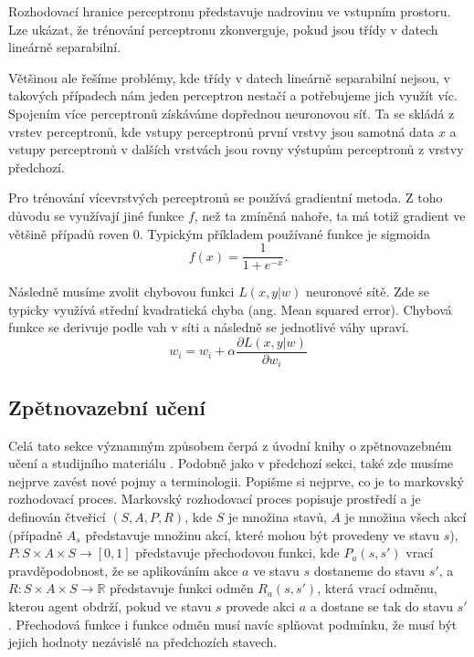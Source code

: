 Rozhodovací hranice perceptronu představuje nadrovinu ve vstupním prostoru. Lze ukázat, že trénování perceptronu zkonverguje, pokud jsou třídy v datech lineárně separabilní.

Většinou ale řešíme problémy, kde třídy v datech lineárně separabilní nejsou, v takových případech nám jeden perceptron nestačí a potřebujeme jich využít víc.
Spojením více perceptronů získáváme dopřednou neuronovou síť.
Ta se skládá z vrstev perceptronů, kde vstupy perceptronů první vrstvy jsou samotná data $x$ a vstupy perceptronů v dalších vrstvách jsou rovny výstupům perceptronů z vrstvy předchozí.

Pro trénování vícevrstvých perceptronů se používá gradientní metoda. Z toho důvodu se využívají jiné funkce $f$, než ta zmíněná nahoře, ta má totiž gradient ve většině případů roven 0.
Typickým příkladem používané funkce je sigmoida \[f(x) = \frac{1}{1+e^{-x}}.\]

Následně musíme zvolit chybovou funkci $L(x,y|w)$ neuronové sítě. Zde se typicky využívá střední kvadratická chyba (ang. Mean squared error).
Chybová funkce se derivuje podle vah v síti a následně se jednotlivé váhy upraví.
\newline
\[w_i = w_i + \alpha\frac{\partial L(x,y|w)}{\partial w_i}\]




\subsection{Zpětnovazební učení}
Celá tato sekce významným způsobem čerpá z úvodní knihy o zpětnovazebném učení \cite{markovDecisionProcesses} a studijního materiálu \cite{deepQ}. 
Podobně jako v předchozí sekci, také zde musíme nejprve zavést nové pojmy a terminologii.
Popišme si nejprve, co je to markovský rozhodovací proces.
Markovský rozhodovací proces popisuje prostředí a je definován čtveřicí $(S,A,P,R)$, kde $S$ je množina stavů, $A$ je množina všech akcí (případně $A_s$ představuje množinu akcí, které mohou být provedeny ve stavu $s$), 
$P: S \times A \times S \rightarrow [0,1]$ představuje přechodovou funkci, 
kde $P_a(s,s')$ vrací pravděpodobnost, že se aplikováním akce $a$ ve stavu $s$ dostaneme do stavu $s'$, 
a $R: S \times A \times S \rightarrow \mathbb{R}$ představuje funkci odměn $R_a(s,s')$, která vrací odměnu, kterou agent obdrží, pokud ve stavu $s$ provede akci $a$ a dostane se tak do stavu $s'$.
Přechodová funkce i funkce odměn musí navíc splňovat podmínku, že musí být jejich hodnoty nezávislé na předchozích stavech.


